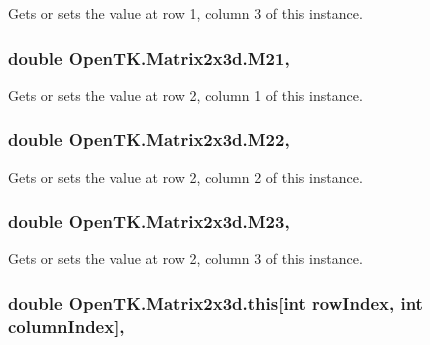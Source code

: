 Gets or sets the value at row 1, column 3 of this instance. 

\hypertarget{struct_open_t_k_1_1_matrix2x3d_a864d261be7349d8f3ea303a94eaeaa40}{
\subsubsection[{M21}]{\setlength{\rightskip}{0pt plus 5cm}double Open\-T\-K.\-Matrix2x3d.\-M21\hspace{0.3cm}{\ttfamily [get]}, {\ttfamily [set]}}}\label{struct_open_t_k_1_1_matrix2x3d_a864d261be7349d8f3ea303a94eaeaa40}


Gets or sets the value at row 2, column 1 of this instance. 

\hypertarget{struct_open_t_k_1_1_matrix2x3d_ad91cdca908b35c96298bd2466a98d933}{
\subsubsection[{M22}]{\setlength{\rightskip}{0pt plus 5cm}double Open\-T\-K.\-Matrix2x3d.\-M22\hspace{0.3cm}{\ttfamily [get]}, {\ttfamily [set]}}}\label{struct_open_t_k_1_1_matrix2x3d_ad91cdca908b35c96298bd2466a98d933}


Gets or sets the value at row 2, column 2 of this instance. 

\hypertarget{struct_open_t_k_1_1_matrix2x3d_abf5489b5128fbf75495c7c193ae7389b}{
\subsubsection[{M23}]{\setlength{\rightskip}{0pt plus 5cm}double Open\-T\-K.\-Matrix2x3d.\-M23\hspace{0.3cm}{\ttfamily [get]}, {\ttfamily [set]}}}\label{struct_open_t_k_1_1_matrix2x3d_abf5489b5128fbf75495c7c193ae7389b}


Gets or sets the value at row 2, column 3 of this instance. 

\hypertarget{struct_open_t_k_1_1_matrix2x3d_a8a55bab941cec8eac958f95ce3d35448}{
\subsubsection[{this[int row\-Index, int column\-Index]}]{\setlength{\rightskip}{0pt plus 5cm}double Open\-T\-K.\-Matrix2x3d.\-this\mbox{[}int row\-Index, int column\-Index\mbox{]}\hspace{0.3cm}{\ttfamily [get]}, {\ttfamily [set]}}}\label{struct_open_t_k_1_1_matrix2x3d_a8a55bab941cec8eac958f95ce3d35448}


